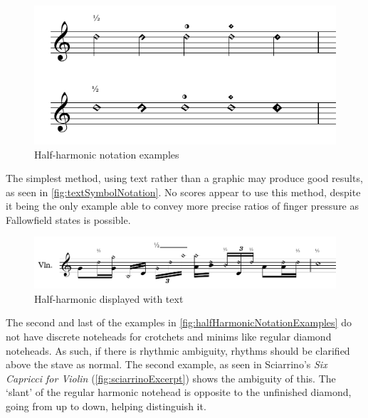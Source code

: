 \begin{figure}
    \includegraphics[width=\linewidth]{./resources/halfHarmonicNotationExamples.pdf}
    \caption{Half-harmonic notation examples}\label{fig:halfHarmonicNotationExamples}
\end{figure}

  
The simplest method, using text rather than a graphic may produce good results, as seen in \autoref{fig:textSymbolNotation}.
No scores appear to use this method, despite it being the only example able to convey more precise ratios of finger pressure as Fallowfield states is possible.\autocite[http://www.cellomap.com/index/the-string/multiphonics-and-other-multiple-sounds/other-multiple-sounds.html]{fallowfieldCelloMap}

\begin{figure}
  \includegraphics[page=1,width=\textwidth]{resources/halfHarmonicsSingleExamples.pdf}
  \caption{Half-harmonic displayed with text}\label{fig:textSymbolNotation}
\end{figure}

The second and last of the examples in \autoref{fig:halfHarmonicNotationExamples} do not have discrete noteheads for crotchets and minims like regular diamond noteheads.
As such, if there is rhythmic ambiguity, rhythms should be clarified above the stave as normal.
The second example, as seen in Sciarrino's \emph{Six Capricci for Violin} (\autoref{fig:sciarrinoExcerpt}) shows the ambiguity of this.
The `slant' of the regular harmonic notehead is opposite to the unfinished diamond, going from up to down, helping distinguish it.

